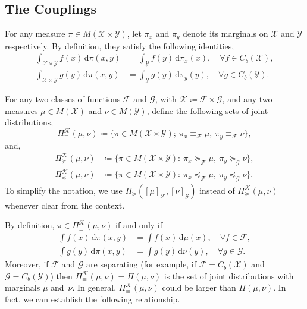 \documentclass[10pt]{article}
\newcommand{\ud}{\,\mathrm{d}}
\newcommand{\calF}{\mathcal{F}}
\newcommand{\calG}{\mathcal{G}}
\newcommand{\calK}{\mathcal{K}}
\newcommand{\calX}{\mathcal{X}}
\newcommand{\calY}{\mathcal{Y}}
\numberwithin{equation}{section}
\begin{document}
\subsection{The Couplings}
For any measure $\pi \in M(\calX \times \calY)$, let $\pi_x$ and $\pi_y$ denote its marginals on $\calX$ and $\calY$ respectively. By definition, they satisfy the following identities,
\begin{align*}
\int_{\calX\times \calY} f(x)\ud \pi(x,y) &= \int_\calY f(y)\ud \pi_x(x),\quad \forall f \in C_b(\calX),\\
\int_{\calX\times \calY} g(y)\ud \pi(x,y) &= \int_\calY g(y)\ud \pi_y(y),\quad \forall g \in C_b(\calY).
\end{align*}
\begin{definition}
For any two classes of functions $\calF$ and $\calG$, with $\calK\coloneqq \calF\times \calG$, and any two measures $\mu \in M(\calX)$ and $\nu \in M(\calY)$, define the following sets of joint distributions, 
\begin{equation*}
\Pi_\equiv^\calK(\mu,\nu)
\coloneqq \bigl\{\pi \in M(\calX\times \calY);~\pi_x\equiv_\calF \mu,~\pi_y\equiv_\calF \nu \bigr\},
\end{equation*}
and,
\begin{align}
\Pi_\succeq^\calK (\mu,\nu)
&\coloneqq \bigl\{\pi\in M(\calX\times \calY):~\pi_x\succeq_\calF \mu,~\pi_y\succeq_\calG \nu \bigr\}, \label{eq:def-Pi-succeq}\\
\Pi_\preceq^\calK (\mu,\nu)
&\coloneqq \bigl\{\pi\in M(\calX\times \calY):~\pi_x\preceq_\calF \mu,~\pi_y\preceq_\calG\nu \bigr\}. \label{eq:def-Pi-preceq}
\end{align}
To simplify the notation, we use $\Pi_\succeq ([\mu]_\calF,[\nu]_\calG)$ instead of $\Pi_\succeq^\calK (\mu,\nu)$ whenever clear from the context.
\end{definition}
By definition, $\pi \in \Pi^\calK_\equiv(\mu,\nu)$ if and only if
\begin{subequations}
\begin{align}
\int f(x)\ud \pi(x,y)&= \int f(x)\ud \mu(x),\quad \forall f \in \calF,\label{eq:couplings-equiv-def-x}\\ \int g(y)\ud \pi(x,y)&=\int g(y)\ud \nu(y),\quad \forall g \in \calG.\label{eq:couplings-equiv-def-y}
\end{align}
\end{subequations}
Moreover, if $\calF$ and $\calG$ are separating (for example, if $\calF=C_b(\calX)$ and $\calG=C_b(\calY)$) then $\Pi^\calK_\equiv(\mu,\nu)=\Pi(\mu,\nu)$ is the set of joint distributions with marginals $\mu$ and~$\nu$. In general, $\Pi^\calK_\equiv(\mu,\nu)$ could be larger than $\Pi(\mu,\nu)$. In fact, we can establish the following relationship. 
\end{document}
